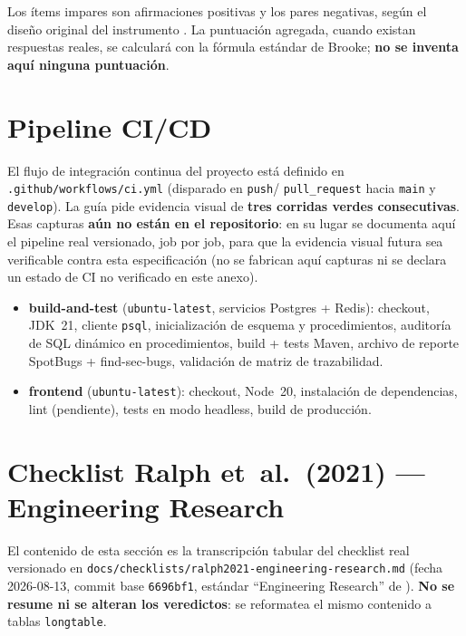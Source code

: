 Los ítems impares son afirmaciones positivas y los pares negativas, según
el diseño original del instrumento \citep{brooke1996sus}. La puntuación
agregada, cuando existan respuestas reales, se calculará con la fórmula
estándar de Brooke; \textbf{no se inventa aquí ninguna puntuación}.

\section{Pipeline CI/CD}

El flujo de integración continua del proyecto está definido en
\texttt{.github/workflows/ci.yml} (disparado en \texttt{push}/
\texttt{pull\_request} hacia \texttt{main} y \texttt{develop}). La guía
pide evidencia visual de \textbf{tres corridas verdes consecutivas}.
Esas capturas \textbf{aún no están en el repositorio}: en su lugar se
documenta aquí el pipeline real versionado, job por job, para que la
evidencia visual futura sea verificable contra esta especificación
(no se fabrican aquí capturas ni se declara un estado de CI no
verificado en este anexo).

\begin{itemize}[leftmargin=1.4cm]
  \item \textbf{build-and-test} (\texttt{ubuntu-latest}, servicios
    Postgres + Redis): checkout, JDK~21, cliente \texttt{psql},
    inicialización de esquema y procedimientos, auditoría de SQL
    dinámico en procedimientos, build + tests Maven, archivo de
    reporte SpotBugs + find-sec-bugs, validación de matriz de
    trazabilidad.
  \item \textbf{frontend} (\texttt{ubuntu-latest}): checkout, Node~20,
    instalación de dependencias, lint (pendiente), tests en modo
    headless, build de producción.
\end{itemize}

\section{Checklist Ralph et~al.\ (2021) --- Engineering Research}

El contenido de esta sección es la transcripción tabular del checklist
real versionado en
\texttt{docs/checklists/ralph2021-engineering-research.md}
(fecha 2026-08-13, commit base \texttt{6696bf1}, estándar
``Engineering Research'' de \citet{ralph2021empiricalstandards}).
\textbf{No se resume ni se alteran los veredictos}: se reformatea el
mismo contenido a tablas \texttt{longtable}.

